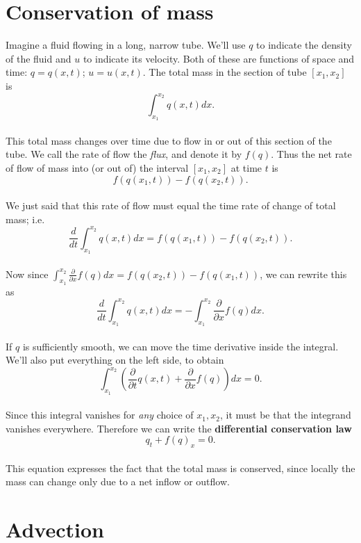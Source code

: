 \documentclass{SIAMbook2016}
\begin{document}
\hypertarget{conservation-of-mass}{%
\section{Conservation of mass}\label{conservation-of-mass}}

Imagine a fluid flowing in a long, narrow tube. We'll use \(q\) to
indicate the density of the fluid and \(u\) to indicate its velocity.
Both of these are functions of space and time: \(q = q(x,t)\);
\(u=u(x,t)\). The total mass in the section of tube \([x_1,x_2]\) is\\
\begin{equation*}
\int_{x_1}^{x_2} q(x,t) dx.
\end{equation*}\\
This total mass changes over time due to flow in or out of this section
of the tube. We call the rate of flow the \emph{flux}, and denote it by
\(f(q)\). Thus the net rate of flow of mass into (or out of) the
interval \([x_1,x_2]\) at time \(t\) is\\
\[f(q(x_1,t)) - f(q(x_2,t)).\]\\
We just said that this rate of flow must equal the time rate of change
of total mass; i.e.\\
\[\frac{d}{dt} \int_{x_1}^{x_2} q(x,t) dx = f(q(x_1,t)) - f(q(x_2,t)).\]\\
Now since
\(\int_{x_1}^{x_2} \frac{\partial}{\partial x} f(q) dx = f(q(x_2,t)) - f(q(x_1,t))\),
we can rewrite this as\\
\[\frac{d}{dt} \int_{x_1}^{x_2} q(x,t) dx = -\int_{x_1}^{x_2} \frac{\partial}{\partial x} f(q) dx.\]\\
If \(q\) is sufficiently smooth, we can move the time derivative inside
the integral. We'll also put everything on the left side, to obtain\\
\[\int_{x_1}^{x_2} \left(\frac{\partial}{\partial t}q(x,t) + \frac{\partial}{\partial x} f(q)\right) dx = 0.\]\\
Since this integral vanishes for \emph{any} choice of \(x_1,x_2\), it
must be that the integrand vanishes everywhere. Therefore we can write
the \textbf{differential conservation law}\\
\[q_t + f(q)_x = 0.\]\\
This equation expresses the fact that the total mass is conserved, since
locally the mass can change only due to a net inflow or outflow.

\hypertarget{advection}{%
\section{Advection}\label{advection}}
\end{document}
